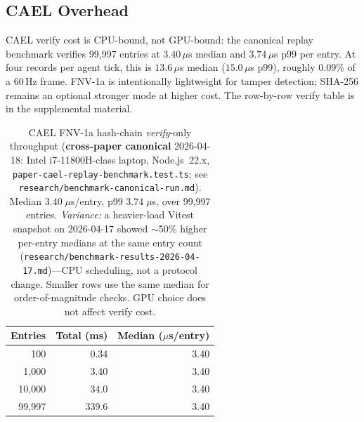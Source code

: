 \documentclass[10pt]{article}
\newcommand{\cael}{\textsc{CAEL}}
\providecommand{\measuredFrom}[1]{}
\begin{document}
\subsection{CAEL Overhead}

\cael{} verify cost is CPU-bound, not GPU-bound: the canonical replay benchmark
verifies 99{,}997 entries at $3.40\,\mu$s median and $3.74\,\mu$s p99 per
entry.
At four records per agent tick, this is $13.6\,\mu$s median
($15.0\,\mu$s p99), roughly $0.09\%$ of a 60\,Hz frame.
FNV-1a is intentionally lightweight for tamper detection; SHA-256 remains an
optional stronger mode at higher cost.
The row-by-row verify table is in the supplemental material.

\iffalse
\begin{table}[t]
\centering
\caption{\cael{} FNV-1a hash-chain \emph{verify}-only throughput (\textbf{cross-paper canonical} 2026-04-18: Intel i7-11800H-class laptop, Node.js~22.x, \texttt{paper-cael-replay-benchmark.test.ts}; see \texttt{research/benchmark-canonical-run.md}).
  Median $3.40\;\mu$s/entry, p99 $3.74\;\mu$s, over 99{,}997 entries.
  \emph{Variance:} a heavier-load Vitest snapshot on 2026-04-17 showed $\sim$50\% higher per-entry medians at the same entry count (\texttt{research/benchmark-results-2026-04-17.md})---CPU scheduling, not a protocol change.
  Smaller rows use the same median for order-of-magnitude checks.
  GPU choice does not affect verify cost.}
\label{tab:cael}
\small
\measuredFrom{HoloScript/packages/engine/src/simulation/__tests__/paper-cael-replay-benchmark.test.ts}%
\measuredFrom{research/benchmark-canonical-run.md}%
\begin{tabular}{@{}rrr@{}}
\toprule
\textbf{Entries} & \textbf{Total (ms)} & \textbf{Median ($\mu$s/entry)} \\
\midrule
100 & 0.34  & 3.40 \\
1{,}000   & 3.40  & 3.40 \\
10{,}000  & 34.0  & 3.40 \\
99{,}997  & 339.6 & 3.40 \\
\bottomrule
\end{tabular}
\end{table}
\end{document}
